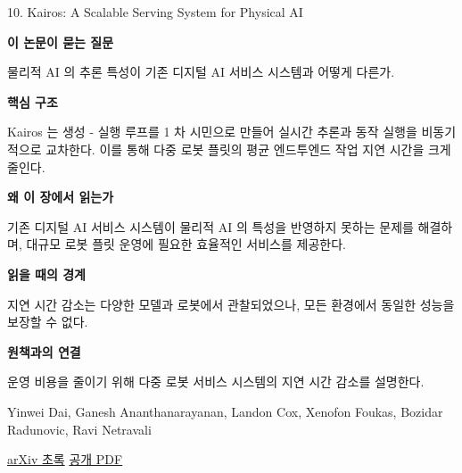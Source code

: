 \documentclass[11pt,openany]{book}
\begin{document}
\begin{termcard}{10. Kairos: A Scalable Serving System for Physical AI}

\par

\medskip

{\sffamily\bfseries\color{deepblue} 이 논문이 묻는 질문}\par

물리적 AI 의 추론 특성이 기존 디지털 AI 서비스 시스템과 어떻게 다른가.

\smallskip

{\sffamily\bfseries\color{deepblue} 핵심 구조}\par

Kairos 는 생성 - 실행 루프를 1 차 시민으로 만들어 실시간 추론과 동작 실행을 비동기적으로 교차한다. 이를 통해 다중 로봇 플릿의 평균 엔드투엔드 작업 지연 시간을 크게 줄인다.

\smallskip

{\sffamily\bfseries\color{deepblue} 왜 이 장에서 읽는가}\par

기존 디지털 AI 서비스 시스템이 물리적 AI 의 특성을 반영하지 못하는 문제를 해결하며, 대규모 로봇 플릿 운영에 필요한 효율적인 서비스를 제공한다.

\smallskip

{\sffamily\bfseries\color{coral} 읽을 때의 경계}\par

지연 시간 감소는 다양한 모델과 로봇에서 관찰되었으나, 모든 환경에서 동일한 성능을 보장할 수 없다.

\smallskip

{\sffamily\bfseries\color{teal} 원책과의 연결}\par

운영 비용을 줄이기 위해 다중 로봇 서비스 시스템의 지연 시간 감소를 설명한다.

\medskip

{\footnotesize\color{muted} Yinwei Dai, Ganesh Ananthanarayanan, Landon Cox, Xenofon Foukas, Bozidar Radunovic, Ravi Netravali\par

\href{https://arxiv.org/abs/2605.11381}{arXiv 초록} \quad \href{https://arxiv.org/pdf/2605.11381}{공개 PDF}\par}

\end{termcard}
\end{document}
